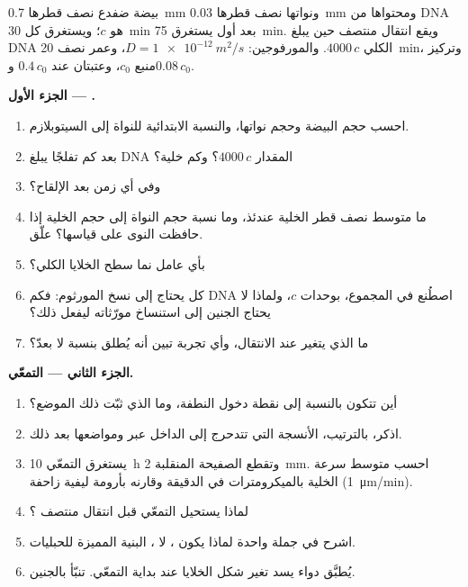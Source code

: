 \begin{problem}
\label{pb:b2:vertebrate-development:1}
بيضة ضفدع نصف قطرها \qty{0.7}{mm} ونواتها نصف قطرها
\qty{0.03}{mm} ومحتواها من DNA هو $c$؛ ويستغرق كل 
\qty{30}{min} بعد  أول يستغرق \qty{75}{min}. ويقع انتقال منتصف
 حين يبلغ DNA الكلي $4000\,c$. والمورفوجين: $D =
\qty{1e-12}{m^2/s}$، وعمر نصف \qty{20}{min}، وتركيز منبع
$c_0$، وعتبتان عند $0.4\,c_0$ و$0.08\,c_0$.

\medskip
\noindent\textbf{الجزء الأول --- .}
\begin{enumerate}
  \item احسب حجم البيضة وحجم نواتها، والنسبة الابتدائية
        للنواة إلى السيتوبلازم.
  \item بعد كم تفلجًا يبلغ DNA المقدار $4000\,c$؟ وكم
        خلية؟
  \item وفي أي زمن بعد الإلقاح؟
  \item ما متوسط نصف قطر الخلية عندئذ، وما نسبة حجم النواة
        إلى حجم الخلية إذا حافظت النوى على قياسها؟ علّق.
  \item بأي عامل نما سطح الخلايا الكلي؟
  \item كل  يحتاج إلى نسخ المورثوم: فكم DNA اصطُنع
        في المجموع، بوحدات $c$، ولماذا لا يحتاج الجنين
        إلى استنساخ مورّثاته ليفعل ذلك؟
  \item ما الذي يتغير عند الانتقال، وأي تجربة تبين
        أنه يُطلق بنسبة لا بعدّ؟
\end{enumerate}

\medskip
\noindent\textbf{الجزء الثاني --- التمعّي.}
\begin{enumerate}[resume]
  \item أين تتكون  بالنسبة إلى نقطة دخول
        النطفة، وما الذي ثبّت ذلك الموضع؟
  \item اذكر، بالترتيب، الأنسجة التي تتدحرج إلى الداخل عبر
         ومواضعها بعد ذلك.
  \item يستغرق التمعّي \qty{10}{h} وتقطع الصفيحة المنقلبة
        \qty{2}{mm}. احسب متوسط سرعة الخلية
        بالميكرومترات في الدقيقة وقارنه بأرومة ليفية زاحفة
        (\qty{1}{\micro m/min}).
  \item لماذا يستحيل التمعّي قبل انتقال منتصف
        ؟
  \item اشرح في جملة واحدة لماذا يكون ، لا
        ، البنية المميزة للحبليات.
  \item يُطبَّق دواء يسد تغير شكل الخلايا عند بداية
        التمعّي. تنبّأ بالجنين.
\end{enumerate}


\end{problem}
